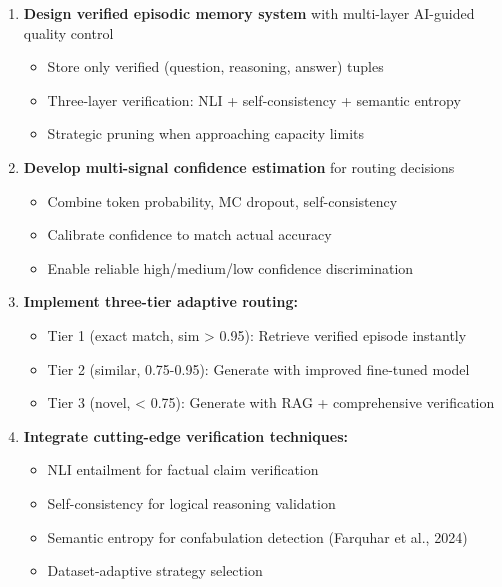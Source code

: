 \documentclass[12pt,a4paper]{article}
\theoremstyle{definition}
\begin{document}
\begin{enumerate}
    \item \textbf{Design verified episodic memory system} with multi-layer AI-guided quality control
    \begin{itemize}
        \item Store only verified (question, reasoning, answer) tuples
        \item Three-layer verification: NLI + self-consistency + semantic entropy
        \item Strategic pruning when approaching capacity limits
    \end{itemize}
    
    \item \textbf{Develop multi-signal confidence estimation} for routing decisions
    \begin{itemize}
        \item Combine token probability, MC dropout, self-consistency
        \item Calibrate confidence to match actual accuracy
        \item Enable reliable high/medium/low confidence discrimination
    \end{itemize}
    
    \item \textbf{Implement three-tier adaptive routing:}
    \begin{itemize}
        \item Tier 1 (exact match, sim > 0.95): Retrieve verified episode instantly
        \item Tier 2 (similar, 0.75-0.95): Generate with improved fine-tuned model
        \item Tier 3 (novel, < 0.75): Generate with RAG + comprehensive verification
    \end{itemize}
    
    \item \textbf{Integrate cutting-edge verification techniques:}
    \begin{itemize}
        \item NLI entailment for factual claim verification
        \item Self-consistency for logical reasoning validation
        \item Semantic entropy for confabulation detection (Farquhar et al., 2024)
        \item Dataset-adaptive strategy selection
    \end{itemize}
    

\end{enumerate}
\end{document}
